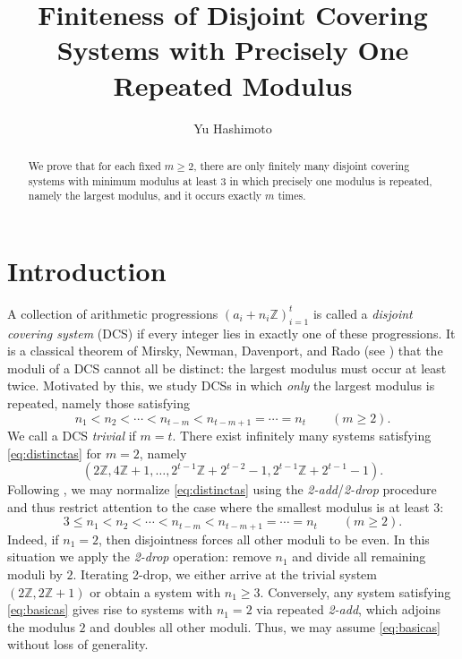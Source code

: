 \documentclass[11pt,reqno]{amsart}
\title{Finiteness of Disjoint Covering Systems with Precisely One Repeated Modulus}
\author{Yu Hashimoto}
\theoremstyle{definition}
\newcommand{\Z}{\mathbb{Z}}
\begin{document}
\begin{abstract}
We prove that for each fixed \(m \ge 2\), there are only finitely many disjoint covering systems with minimum modulus at least \(3\) in which precisely one modulus is repeated, namely the largest modulus, and it occurs exactly \(m\) times.
\end{abstract}
\maketitle
\section{Introduction}

A collection of arithmetic progressions \((a_i+n_i\Z)_{i=1}^t\) is called a \emph{disjoint covering system} (DCS) if
every integer lies in exactly one of these progressions.
It is a classical theorem of Mirsky, Newman, Davenport, and Rado (see \cite{Erdos}) that the moduli of a DCS cannot all be distinct: the largest modulus must occur at least twice.
Motivated by this, we study DCSs in which \emph{only} the largest modulus is repeated, namely those satisfying
\begin{equation}\label{eq:distinctas}
n_1 < n_2 < \cdots < n_{t-m} < n_{t-m+1}=\cdots=n_t
\qquad (m\ge 2).
\end{equation}
We call a DCS \emph{trivial} if \(m=t\).
There exist infinitely many systems satisfying \eqref{eq:distinctas} for \(m = 2\), namely
\begin{equation}\label{eq:trivial}
(2\Z, 4\Z +1, \ldots ,2^{t-1}\Z + 2^{t-2} - 1,2^{t-1}\Z + 2^{t-1} - 1).
\end{equation}
Following \cite{BFF}, we may normalize \eqref{eq:distinctas} using the \emph{2-add}/\emph{2-drop} procedure and thus restrict
attention to the case where the smallest modulus is at least \(3\):
\begin{equation}\label{eq:basicas}
3 \le n_1 < n_2 < \cdots < n_{t-m} < n_{t-m+1}=\cdots=n_t
\qquad (m\ge 2).
\end{equation}
Indeed, if \(n_1 = 2\), then disjointness forces all other moduli to be even.
In this situation we apply the \emph{2-drop} operation: remove \(n_1\) and divide all remaining moduli by \(2\). Iterating 2-drop, we either arrive at the trivial system \(( 2\Z,2\Z + 1 )\)
or obtain a system with \(n_1 \ge 3\).
Conversely, any system satisfying \eqref{eq:basicas} gives rise to systems with \(n_1 = 2\) via repeated \emph{2-add},
which adjoins the modulus \(2\) and doubles all other moduli. Thus, we may assume \eqref{eq:basicas} without loss of generality.
\end{document}
